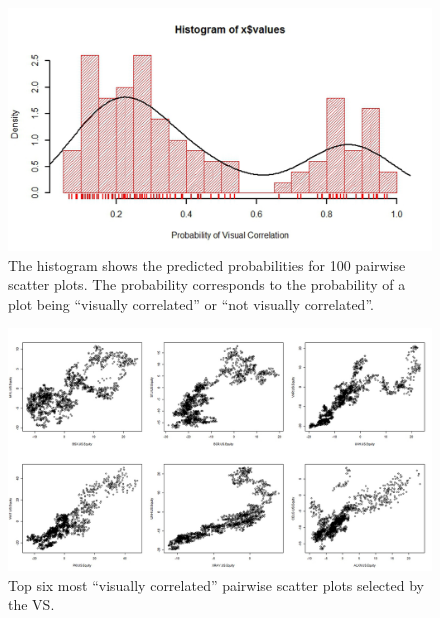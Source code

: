 \begin{figure}[htb]
	\begin{center}
		\includegraphics[width=1\linewidth]
		{ch-usage/figures/predicted_probability_histogram}
		\caption[Histogram of predicted probabilities.]{The histogram shows the 
		predicted probabilities for 100 pairwise scatter plots. The 
		probability corresponds to the probability of a plot being 
		``visually correlated'' or ``not visually correlated''.}
		\label{fig:usage:hist}
	\end{center}
\end{figure}

\begin{figure}[htb]
	\begin{center}
		\includegraphics[width=1\linewidth]
		{ch-usage/figures/topinterestingplots}
		\caption[Top six most ``visually correlated'' pairwise scatter plots	
		selected by the VS.]{Top six most ``visually correlated'' pairwise 
		scatter plots selected by the VS.}
		\label{fig:usage:interestingplots}
	\end{center}
\end{figure}

